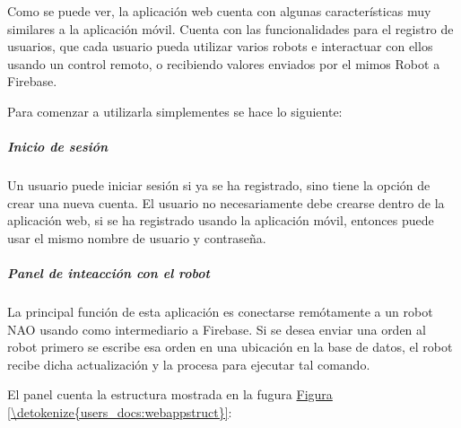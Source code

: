 Como se puede ver, la aplicación web cuenta con algunas características
muy similares a la aplicación móvil. Cuenta con las funcionalidades para
el registro de usuarios, que cada usuario pueda utilizar varios robots e
interactuar con ellos usando un control remoto, o recibiendo valores enviados
por el mimos Robot a Firebase.

Para comenzar a utilizarla simplementes se hace lo siguiente:


\subparagraph{Inicio de sesión}
\label{\detokenize{inicio-de-sesion}}
Un usuario puede iniciar sesión si ya se ha registrado, sino tiene la opción
de crear una nueva cuenta. El usuario no necesariamente debe crearse dentro
de la aplicación web, si se ha registrado usando la aplicación móvil, entonces
puede usar el mismo nombre de usuario y contraseña.


\subparagraph{Panel de inteacción con el robot}
\label{\detokenize{users_docs:panel-de-inteaccion-con-el-robot}}
La principal función de esta aplicación es conectarse remótamente a un robot
NAO usando como intermediario a Firebase. Si se desea enviar una orden al robot
primero se escribe esa orden en una ubicación en la base de datos, el robot
recibe dicha actualización y la procesa para ejecutar tal comando.

El panel cuenta la estructura mostrada en la fugura \hyperref[\detokenize{users_docs:webappstruct}]{Figura \ref{\detokenize{users_docs:webappstruct}}}:

